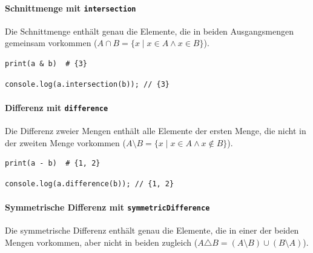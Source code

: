 \paragraph{Schnittmenge mit \texttt{intersection}}
Die Schnittmenge enthält genau die Elemente, die in beiden Ausgangsmengen gemeinsam vorkommen (\(A \cap B = \{x \mid x \in A \land x \in B\}\)).

\begin{listing}[ht]
    \caption{Schnittmenge zweier Mengen in Python und mit \texttt{RecursiveSet}}
    \label{lst:rs_intersection_comparison}
    \begin{verbatim}
print(a & b)  # {3}
    \end{verbatim}
    
    
    
    \begin{verbatim}
console.log(a.intersection(b)); // {3}
    \end{verbatim}
\end{listing}

\paragraph{Differenz mit \texttt{difference}}
Die Differenz zweier Mengen enthält alle Elemente der ersten Menge, die nicht in der zweiten Menge vorkommen (\(A \setminus B = \{x \mid x \in A \land x \notin B\}\)). 

\begin{listing}[ht]
    \caption{Differenz zweier Mengen in Python und mit \texttt{RecursiveSet}}
    \label{lst:rs_difference_comparison}
    \begin{verbatim}
print(a - b)  # {1, 2}
    \end{verbatim}
    
    
    
    \begin{verbatim}
console.log(a.difference(b)); // {1, 2}
    \end{verbatim}
\end{listing}

\paragraph{Symmetrische Differenz mit \texttt{symmetricDifference}}
Die symmetrische Differenz enthält genau die Elemente, die in einer der beiden Mengen vorkommen, aber nicht in beiden zugleich (\(A \triangle B = (A \setminus B) \cup (B \setminus A)\)).


